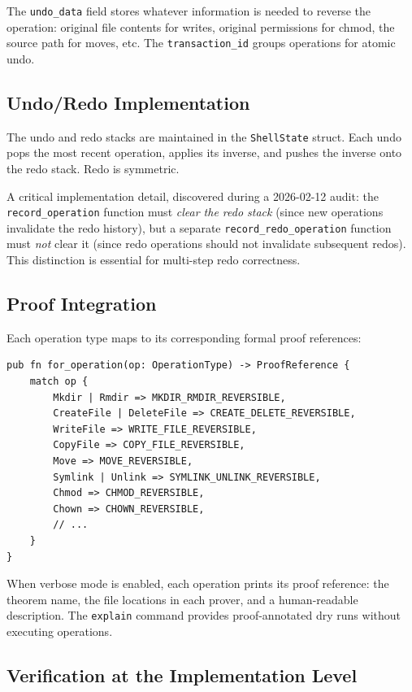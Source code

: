 \documentclass[11pt,a4paper]{article}
\begin{document}
The \texttt{undo\_data} field stores whatever information is needed to reverse
the operation: original file contents for writes, original permissions for
chmod, the source path for moves, etc. The \texttt{transaction\_id} groups
operations for atomic undo.

\subsection{Undo/Redo Implementation}

The undo and redo stacks are maintained in the \texttt{ShellState} struct. Each
undo pops the most recent operation, applies its inverse, and pushes the
inverse onto the redo stack. Redo is symmetric.

A critical implementation detail, discovered during a 2026-02-12 audit: the
\texttt{record\_operation} function must \emph{clear the redo stack} (since
new operations invalidate the redo history), but a separate
\texttt{record\_redo\_operation} function must \emph{not} clear it (since redo
operations should not invalidate subsequent redos). This distinction is
essential for multi-step redo correctness.

\subsection{Proof Integration}

Each operation type maps to its corresponding formal proof references:

\begin{lstlisting}[style=ruststyle,caption={Proof reference mapping.}]
pub fn for_operation(op: OperationType) -> ProofReference {
    match op {
        Mkdir | Rmdir => MKDIR_RMDIR_REVERSIBLE,
        CreateFile | DeleteFile => CREATE_DELETE_REVERSIBLE,
        WriteFile => WRITE_FILE_REVERSIBLE,
        CopyFile => COPY_FILE_REVERSIBLE,
        Move => MOVE_REVERSIBLE,
        Symlink | Unlink => SYMLINK_UNLINK_REVERSIBLE,
        Chmod => CHMOD_REVERSIBLE,
        Chown => CHOWN_REVERSIBLE,
        // ...
    }
}
\end{lstlisting}

When verbose mode is enabled, each operation prints its proof reference:
the theorem name, the file locations in each prover, and a human-readable
description. The \texttt{explain} command provides proof-annotated dry runs
without executing operations.

\subsection{Verification at the Implementation Level}
\end{document}
